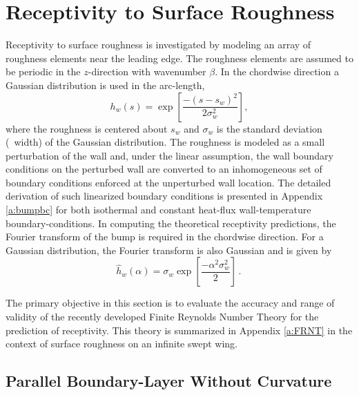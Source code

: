 \section{Receptivity to Surface Roughness \label{s:pcyl3d}}

Receptivity to surface roughness is investigated by modeling an array of
roughness elements near the leading edge.  The roughness elements are assumed
to be periodic in the $z$-direction with wavenumber $\beta$.  In the chordwise
direction a Gaussian distribution is used in the arc-length,
%
\begin{equation} \label{e:PHYbump}
  h_w(s) = \exp\left[ \frac{-( s - s_w)^2}{2 \sigma_w^2} \right] \comma
\end{equation}
%
where the roughness is centered about $s_w$ and $\sigma_w$ is the standard
deviation (\ie\ width) of the Gaussian distribution.  The roughness is modeled
as a small perturbation of the wall and, under the linear assumption, the wall
boundary conditions on the perturbed wall are converted to an inhomogeneous
set of boundary conditions enforced at the unperturbed wall location.  The
detailed derivation of such linearized boundary conditions is presented in
Appendix \ref{a:bumpbc} for both isothermal and constant heat-flux
wall-temperature boundary-conditions.  In computing the theoretical
receptivity predictions, the Fourier transform of the bump is required in the
chordwise direction.  For a Gaussian distribution, the Fourier transform is
also Gaussian and is given by
%
\begin{equation} \label{e:FTbump}
  \hat h_w(\alpha) = \sigma_w \exp\left[ \frac{-\alpha^2\sigma_w^2}{2} \right] 
  \period
\end{equation}

The primary objective in this section is to evaluate the accuracy and range of
validity of the recently developed Finite Reynolds Number Theory for the
prediction of receptivity.  This theory is summarized in Appendix \ref{a:FRNT}
in the context of surface roughness on an infinite swept wing.
%
%
%

\subsection{Parallel Boundary-Layer Without Curvature \label{ss:pblfp} }

